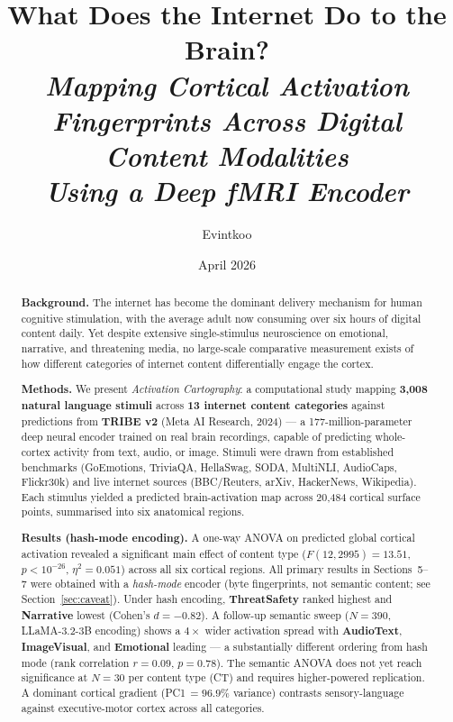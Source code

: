 \documentclass[11pt,letterpaper]{article}
\title{%
  \vspace{-1.0em}
  {\sffamily\bfseries\LARGE What Does the Internet Do to the Brain?}\\[0.5em]
  {\large\itshape Mapping Cortical Activation Fingerprints Across Digital Content Modalities\\[0.15em]
   Using a Deep fMRI Encoder}%
  \vspace{-0.6em}
}
\author[1]{Evintkoo}
\affil[1]{\small Independent Research \\ \href{mailto:evint.koo@gmail.com}{\texttt{evint.koo@gmail.com}}}
\date{\small April 2026}
\begin{document}
\maketitle
\thispagestyle{fancy}

\vspace{-0.8em}

\begin{abstract}
\small
\noindent\textbf{Background.} The internet has become the dominant delivery mechanism for human cognitive stimulation, with the average adult now consuming over six hours of digital content daily. Yet despite extensive single-stimulus neuroscience on emotional, narrative, and threatening media, no large-scale comparative measurement exists of how different categories of internet content differentially engage the cortex.

\noindent\textbf{Methods.} We present \textit{Activation Cartography}: a computational study mapping \textbf{3{,}008 natural language stimuli} across \textbf{13 internet content categories} against predictions from \textbf{TRIBE v2} (Meta AI Research, 2024) --- a 177-million-parameter deep neural encoder trained on real brain recordings, capable of predicting whole-cortex activity from text, audio, or image. Stimuli were drawn from established benchmarks (GoEmotions, TriviaQA, HellaSwag, SODA, MultiNLI, AudioCaps, Flickr30k) and live internet sources (BBC/Reuters, arXiv, HackerNews, Wikipedia). Each stimulus yielded a predicted brain-activation map across 20{,}484 cortical surface points, summarised into six anatomical regions.

\noindent\textbf{Results (hash-mode encoding).} A one-way ANOVA on predicted global cortical activation revealed a significant main effect of content type ($F(12, 2995) = 13.51$, $p < 10^{-26}$, $\eta^2 = 0.051$) across all six cortical regions. All primary results in Sections~5--7 were obtained with a \emph{hash-mode} encoder (byte fingerprints, not semantic content; see Section~\ref{sec:caveat}). Under hash encoding, \textbf{ThreatSafety} ranked highest and \textbf{Narrative} lowest (Cohen's $d = -0.82$). A follow-up semantic sweep ($N=390$, LLaMA-3.2-3B encoding) shows a $4\times$ wider activation spread with \textbf{AudioText}, \textbf{ImageVisual}, and \textbf{Emotional} leading --- a substantially different ordering from hash mode (rank correlation $r=0.09$, $p=0.78$). The semantic ANOVA does not yet reach significance at $N=30$ per content type (CT) and requires higher-powered replication. A dominant cortical gradient (PC1\,$= 96.9\%$ variance) contrasts sensory-language against executive-motor cortex across all categories.


\end{abstract}
\end{document}

